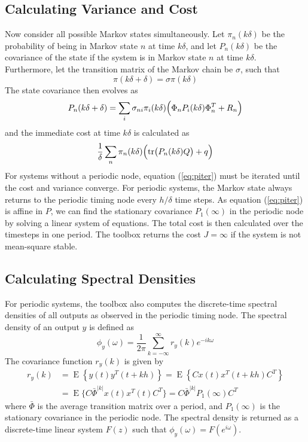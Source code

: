 \documentclass[final,twoside]{rapport}  %
\DeclareMathOperator{\E}{E}
\begin{document}
\subsection{Calculating Variance and Cost}
\label{sec:calcvar}

Now consider all possible Markov states simultaneously.
Let $\pi_n(k\delta)$ be the probability of being in Markov state $n$ at time
$k\delta$, and let $P_n(k\delta)$ be the covariance of the state if the
system is in 
Markov state $n$ at time $k\delta$. Furthermore, let the transition
matrix of the Markov chain be $\sigma$, such that
\begin{equation*}
\pi(k\delta+\delta) = \sigma \pi(k\delta)
\end{equation*}
The state covariance then evolves as
\begin{equation}
\label{eq:piter}
P_n(k\delta+\delta) = \sum_{i} \sigma_{ni} \pi_i(k\delta)  
\Bigl ( \Phi_{n} P_i(k\delta) \Phi^T_{n} + R_{n} \Bigr )
\end{equation}
and the immediate cost at time $k\delta$ is calculated as
\begin{equation*}
\frac{1}{\delta} \sum_n  \pi_n(k\delta) \Bigl ({\rm tr} \bigl (
P_n(k\delta)Q \bigr ) +
q \Bigr )
\end{equation*}
For systems without a periodic node, equation (\ref{eq:piter}) must
be iterated until the cost and variance converge.
For periodic systems, the Markov state always returns to the periodic
timing node every $h/\delta$ time steps. As equation (\ref{eq:piter}) is
affine in $P$, we can find the stationary covariance $P_1(\infty)$ in
the periodic node by solving a linear system of equations.
The total cost is then calculated over the timesteps in one period.
The toolbox returns the
cost $J=\infty$ if the system is not mean-square stable.

\subsection{Calculating Spectral Densities}
For periodic systems, the toolbox also computes the discrete-time spectral
densities of all outputs as observed in the periodic timing node. The
spectral density of an output $y$ is defined as
\begin{equation*}
\phi_y(\omega) = \frac{1}{2\pi} \sum_{k=-\infty}^{\infty} \!
r_y(k) e^{-ik\omega}
\end{equation*}
The covariance function $r_y(k)$ is given by
\begin{equation*}
\begin{aligned}
r_y(k) &= \E \left\{ y(t)y^T\!(t+kh) \right\} = \E
\left\{Cx(t)x^T\!(t+kh)C^T \right\} \\
&= \E\bigl\{C\bar \Phi^{|k|} x(t)x^T\!(t)C^T\bigr\}
= C\bar \Phi^{|k|}P_1(\infty)C^T
\end{aligned}
\end{equation*}
where $\bar \Phi$ is the average transition matrix over a
period, and $P_1(\infty)$ is the stationary covariance in the periodic
node. The spectral density is returned as a discrete-time linear
system $F(z)$ such that $\phi_y(\omega) = F(e^{i\omega})$.
\end{document}
